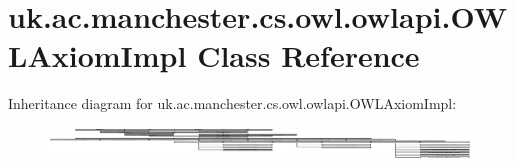 \hypertarget{classuk_1_1ac_1_1manchester_1_1cs_1_1owl_1_1owlapi_1_1_o_w_l_axiom_impl}{\section{uk.\-ac.\-manchester.\-cs.\-owl.\-owlapi.\-O\-W\-L\-Axiom\-Impl Class Reference}
\label{classuk_1_1ac_1_1manchester_1_1cs_1_1owl_1_1owlapi_1_1_o_w_l_axiom_impl}
}
Inheritance diagram for uk.\-ac.\-manchester.\-cs.\-owl.\-owlapi.\-O\-W\-L\-Axiom\-Impl\-:\begin{figure}[H]
\begin{center}
\leavevmode
\includegraphics[height=0.825046cm]{classuk_1_1ac_1_1manchester_1_1cs_1_1owl_1_1owlapi_1_1_o_w_l_axiom_impl}
\end{center}
\end{figure}
